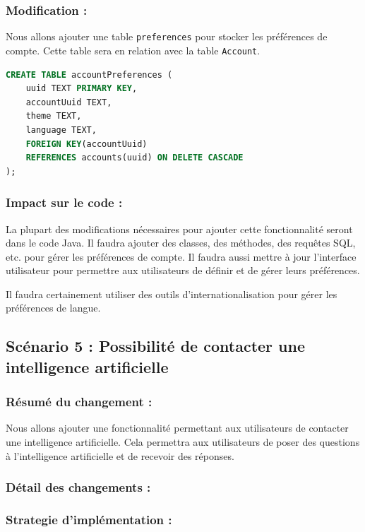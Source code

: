 \documentclass[a4paper,11pt]{article}
\begin{document}
\subsubsection*{Modification :}

Nous allons ajouter une table \texttt{preferences} pour stocker les préférences de compte. Cette table sera en relation avec la table \texttt{Account}.

\begin{lstlisting}[language=SQL]
CREATE TABLE accountPreferences (
	uuid TEXT PRIMARY KEY,
	accountUuid TEXT,
	theme TEXT,
	language TEXT,
	FOREIGN KEY(accountUuid) 
	REFERENCES accounts(uuid) ON DELETE CASCADE
);
\end{lstlisting}

\subsubsection*{Impact sur le code :}

La plupart des modifications nécessaires pour ajouter cette fonctionnalité seront dans le code Java. Il faudra ajouter des classes, des méthodes, des requêtes SQL, etc. pour gérer les préférences de compte. Il faudra aussi mettre à jour l'interface utilisateur pour permettre aux utilisateurs de définir et de gérer leurs préférences.

Il faudra certainement utiliser des outils d'internationalisation pour gérer les préférences de langue.

\subsection*{Scénario 5 : Possibilité de contacter une intelligence artificielle}

\subsubsection*{Résumé du changement :}

Nous allons ajouter une fonctionnalité permettant aux utilisateurs de contacter une intelligence artificielle. Cela permettra aux utilisateurs de poser des questions à l'intelligence artificielle et de recevoir des réponses.

\subsubsection*{Détail des changements :}

\subsubsection*{Strategie d'implémentation :}
\end{document}
